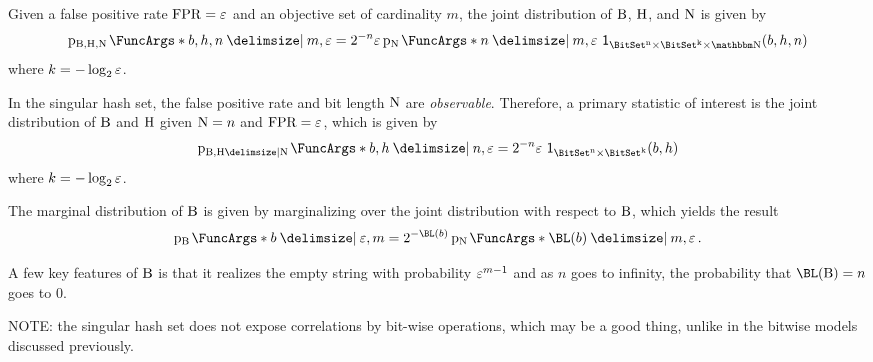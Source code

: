 \documentclass[ ../main.tex]{subfiles}
\begin{document}
Given a false positive rate $\mathrm{FPR} = \varepsilon$ and an objective set of cardinality $m$, the joint distribution of $\mathrm{B}$, $\mathrm{H}$, and $\mathrm{N}$ is given by
\begin{equation}
\PDF{b,h,n \Given m,\fprate}[\RV{B},\RV{H},\RV{N}] = 2^{-n} \fprate \PDF{n \Given m,\fprate}[\RV{N}]\, \SetIndicator{\BitSet^n \times \BitSet^k \times \NatSet}(b,h,n)
\end{equation}
where $k = -\log_2 \varepsilon$.

In the singular hash set, the false positive rate and bit length $\mathrm{N}$ are \emph{observable}.
Therefore, a primary statistic of interest is the joint distribution of $\mathrm{B}$ and $\mathrm{H}$ given $\mathrm{N} = n$ and $\mathrm{FPR} = \varepsilon$, which is given by
\begin{equation}
\PDF{b,h \Given n,\fprate}[\RV{B},\RV{H} \Given \RV{N}] = 2^{-n} \fprate \, \SetIndicator{\BitSet^n \times \BitSet^k}(b,h)
\end{equation}
where $k = -\log_2 \varepsilon$.



%


The marginal distribution of $\mathrm{B}$ is given by marginalizing over the joint distribution with respect to $\mathrm{B}$, which yields the result
\begin{equation}
\PDF{b \Given \fprate, m}[\RV{B}] = 2^{-\BL(b)} \PDF{\BL(b) \Given m, \fprate}[\RV{N}]\,.
\end{equation}



A few key features of $\mathrm{B}$ is that it realizes the empty string with probability $\varepsilon^{m-1}$ and as $n$ goes to infinity, the probability that $\BL(\RV{B})=n$ goes to $0$.



NOTE: the singular hash set does not expose correlations by bit-wise operations, which may be a good thing, unlike in the bitwise models discussed previously.


\end{document}
